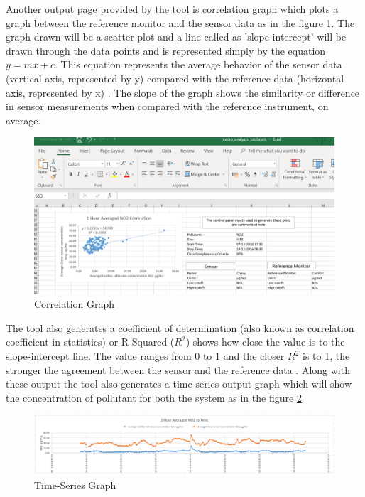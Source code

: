 \documentclass[12pt,a4paper,oneside]{report}
\begin{document}
 
\par
Another output page provided by the tool is correlation graph which plots a graph between the reference monitor and the sensor data as in the figure \ref{cor}.
The graph drawn will be a scatter plot and a line called as 'slope-intercept' will be drawn through the data points and is represented simply by the equation $ y = mx + c $. This equation represents the average behavior of the sensor data (vertical axis, represented by y) compared with the reference data (horizontal axis, represented by x) \cite{National2017}. The slope of the graph shows the similarity or difference in sensor measurements when compared with the reference instrument, on average. 

\begin{figure}[h]
    \begin{center}
    \includegraphics[scale=0.35]{images/figure7.png}
    \end{center}
    \caption{Correlation Graph}
    \label{cor}
  \end{figure}

The tool also generates a coefficient of determination (also known as correlation coefficient in statistics) or R-Squared ($R^2 $) shows how close the value is to the slope-intercept line. The value ranges from 0 to 1 and the closer $R^2$ is to 1, the stronger the agreement between the sensor and the reference data \cite{Williams2018}. Along with these output the tool also generates a time series output graph which will show the concentration of pollutant for both the system as in the figure \ref{time}

\begin{figure}[h]
    \begin{center}
    \includegraphics[scale=0.40]{images/figure8.png}
    \end{center}
    \caption{Time-Series Graph}
    \label{time}
  \end{figure}
\end{document}
